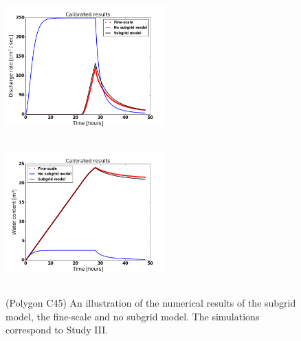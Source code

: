 \documentclass[review,11pt]{elsarticle}
\begin{document}
\begin{figure}[!h]
\centering
\includegraphics[width=6.2cm, height=5.5cm]{./figures/POLYGON45/POLYGON45dischargeCalibDDManning.png}
\includegraphics[width=6.2cm, height=5.5cm]{./figures/POLYGON45/POLYGON45watercontentCalibDDManning.png}
\caption{(Polygon C45) An illustration of the numerical results of the subgrid model, the fine-scale and no subgrid model. The simulations correspond to Study III.}
\label{polygon-C45}
\end{figure}
\end{document}
